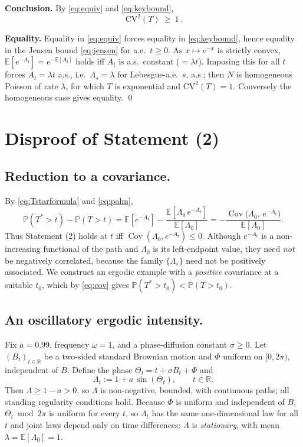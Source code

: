 \documentclass{amsart}
\theoremstyle{plain}
\theoremstyle{definition}
\newcommand{\E}{\mathbb{E}}
\newcommand{\Prob}{\mathbb{P}}
\newcommand{\R}{\mathbb{R}}
\newcommand{\Lam}{\Lambda}
\DeclareMathOperator{\Cov}{Cov}
\begin{document}
\noindent\textbf{Conclusion.} By \eqref{eq:equiv} and \eqref{eq:keybound},
\[
  \boxed{\ \mathrm{CV}^2(T)\ \ge\ 1\ }.
\]

\noindent\textbf{Equality.} Equality in \eqref{eq:equiv} forces equality in
\eqref{eq:keybound}, hence equality in the Jensen bound \eqref{eq:jensen} for a.e.\
$t\ge0$. As $x\mapsto e^{-x}$ is strictly convex, $\E[e^{-A_t}]=e^{-\E[A_t]}$ holds iff
$A_t$ is a.s.\ constant ($=\lambda t$). Imposing this for all $t$ forces
$A_t=\lambda t$ a.s., i.e.\ $\Lam_s=\lambda$ for Lebesgue-a.e.\ $s$, a.s.; then $N$ is
homogeneous Poisson of rate $\lambda$, for which $T$ is exponential and
$\mathrm{CV}^2(T)=1$. Conversely the homogeneous case gives equality. \qed

\section{Disproof of Statement (2)}

\subsection*{Reduction to a covariance.}
By \eqref{eq:Tstarformula} and \eqref{eq:palm},
\begin{equation}\label{eq:cov}
  \Prob(T^\ast>t)-\Prob(T>t)
   =\E[e^{-A_t}]-\frac{\E[\Lam_0\,e^{-A_t}]}{\E[\Lam_0]}
   =-\frac{\Cov\big(\Lam_0,\,e^{-A_t}\big)}{\E[\Lam_0]} .
\end{equation}
Thus Statement (2) holds at $t$ iff $\Cov(\Lam_0,e^{-A_t})\le0$. Although $e^{-A_t}$
is a non-increasing functional of the path and $\Lam_0$ is its left-endpoint value,
they need \emph{not} be negatively correlated, because the family $\{\Lam_s\}$ need not
be positively associated. We construct an ergodic example with a \emph{positive}
covariance at a suitable $t_0$, which by \eqref{eq:cov} gives
$\Prob(T^\ast>t_0)<\Prob(T>t_0)$.

\subsection*{An oscillatory ergodic intensity.}
Fix $a=0.99$, frequency $\omega=1$, and a phase-diffusion constant $\sigma\ge0$. Let
$(B_t)_{t\in\R}$ be a two-sided standard Brownian motion and $\Phi$ uniform on
$[0,2\pi)$, independent of $B$. Define the phase $\Theta_t=t+\sigma B_t+\Phi$ and
\begin{equation}\label{eq:ex}
  \Lam_t:=1+a\,\sin(\Theta_t),\qquad t\in\R .
\end{equation}
Then $\Lam\ge1-a>0$, so $\Lam$ is non-negative, bounded, with continuous paths; all
standing regularity conditions hold. Because $\Phi$ is uniform and independent of $B$,
$\Theta_t\bmod 2\pi$ is uniform for every $t$, so $\Lam_t$ has the same one-dimensional
law for all $t$ and joint laws depend only on time differences: $\Lam$ is
\emph{stationary}, with mean $\lambda=\E[\Lam_0]=1$.
\end{document}

